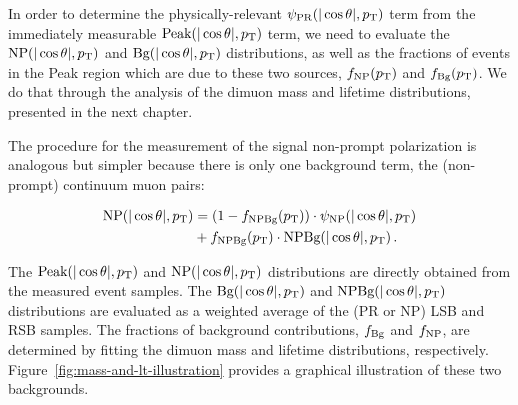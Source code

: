 In order to determine the physically-relevant $\psi_\mathrm{PR}(|\cos\theta|,p_\text{T})$ term from the 
immediately measurable $\text{Peak}(|\cos\theta|,p_\text{T})$ term,
we need to evaluate the $\text{NP}(|\cos\theta|,p_\text{T})$ and $\text{Bg}(|\cos\theta|,p_\text{T})$ distributions,
as well as the fractions of events in the Peak region which are due to these two sources,
$f_{\rm NP}(p_\text{T})$ and $f_{\rm Bg}(p_\text{T})$.
We do that through the analysis of the dimuon mass and lifetime distributions,
presented in the next chapter.

The procedure for the measurement of the signal non-prompt \jpsi polarization is
analogous but simpler 
because there is only one background term, the (non-prompt) continuum muon pairs:

\begin{equation}
\begin{split}
\text{NP}(|\cos\theta|,p_\text{T})
&= (1 - f_{\rm NPBg}(p_\text{T})) \cdot \psi_{\rm NP}(|\cos\theta|,p_\text{T}) \\
&+ f_{\rm NPBg}(p_\text{T}) \cdot \text{NPBg}(|\cos\theta|,p_\text{T}) \, .
\end{split}
\label{eq:bkgSub_psi_NP}
\end{equation}


\vfill\newpage

The $\text{Peak}(|\cos\theta|,p_\text{T})$ and $\text{NP}(|\cos\theta|,p_\text{T})$ distributions 
are directly obtained from the measured event samples.
The $\text{Bg}(|\cos\theta|,p_\text{T})$ and $\text{NPBg}(|\cos\theta|,p_\text{T})$
distributions are evaluated as a weighted average of the (PR or NP) LSB and RSB samples.
The fractions of background contributions, $f_{\rm Bg}$ and $f_{\rm NP}$, 
are determined by fitting the dimuon mass and lifetime distributions, respectively.
Figure~\ref{fig:mass-and-lt-illustration} provides a graphical illustration of these
two backgrounds.

